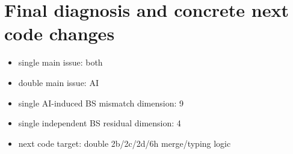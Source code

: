 \documentclass[11pt]{article}
\begin{document}
\section{Final diagnosis and concrete next code changes}
\begin{itemize}
\item single main issue: both
\item double main issue: AI
\item single AI-induced BS mismatch dimension: 9
\item single independent BS residual dimension: 4
\item next code target: double 2b/2c/2d/6h merge/typing logic
\end{itemize}
\end{document}

